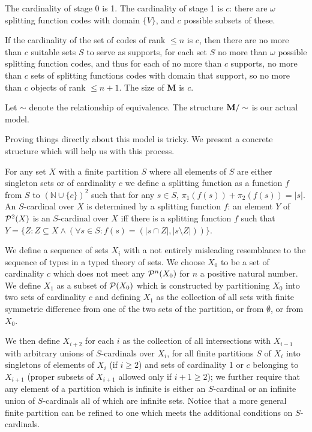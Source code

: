 \documentclass{article}
\begin{document}
\begin{description}
The cardinality of stage 0 is 1.  The cardinality of stage 1 is $c$:  there are $\omega$ splitting function codes with domain $\{V\}$, and $c$ possible subsets of these.

If the cardinality of the set of codes of rank $\leq n$ is $c$, then there are no more than $c$ suitable sets $S$ to serve as supports, for each set $S$ no more than $\omega$ possible splitting function codes,
and thus for each of no more than $c$ supports, no more than $c$ sets of splitting functions codes with domain that support, so no more than $c$ objects of rank $\leq n+1$.  The size of {\bf M} is $c$.

Let $\sim$ denote the relationship of equivalence.  The structure ${\bf M}/\sim$ is our actual model.

Proving things directly about this model is tricky.  We present a concrete structure which will help us with this process.

For any set $X$ with a finite partition $S$ where all elements of $S$ are either singleton sets or of cardinality $c$ we define a splitting function as a function $f$ from $S$ to $({\mathbb N} \cup \{c\})^2$ such that 
for any $s \in S$, $\pi_1(f(s)) + \pi_2(f(s)) = |s|$.  An $S$-cardinal over $X$ is determined by a splitting function $f$:   an element $Y$ of ${\cal P}^2(X)$ is an $S$-cardinal over $X$ iff
there is a splitting function $f$ such that $Y = \{Z:Z \subseteq X \wedge (\forall s \in S:  f(s) = (|s \cap Z|,|s \setminus Z|))\}$.

We define a sequence of sets $X_i$ with a not entirely misleading resemblance to the sequence of types in a typed theory of sets.  We choose $X_0$ to be a set of cardinality $c$ which does not
meet any ${\cal P}^n(X_0)$ for $n$ a positive natural number.  We define $X_1$ as a subset of ${\cal P}(X_0)$ which is constructed by partitioning $X_0$ into two sets of cardinality $c$ and
defining $X_1$ as the collection of all sets with finite symmetric difference from one of the two sets of the partition, or from $\emptyset$, or from $X_0$.

We then define $X_{i+2}$ for each $i$ as the collection of all intersections with $X_{i-1}$ with arbitrary  unions of $S$-cardinals over $X_i$, for all finite partitions $S$ of $X_i$ into singletons of elements of $X_i$ (if $i \geq 2$) and sets of cardinality 1 or $c$ belonging to $X_{i+1}$ (proper subsets of $X_{i+1}$ allowed only if $i+1 \geq 2$); we further require that any element of a partition which is infinite is either an $S$-cardinal or an infinite union of $S$-cardinals all of which are infinite sets.  Notice that a more general finite partition can be refined to one which meets the additional conditions on $S$-cardinals.


\end{description}
\end{document}
